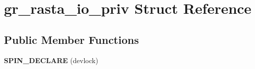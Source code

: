 \hypertarget{structgr__rasta__io__priv}{}\section{gr\+\_\+rasta\+\_\+io\+\_\+priv Struct Reference}
\label{structgr__rasta__io__priv}
\subsection*{Public Member Functions}
\begin{DoxyCompactItemize}
\item 
\mbox{\label{structgr__rasta__io__priv_a439dda12d825ab0593647ca3c8b536e3}} 
{\bfseries S\+P\+I\+N\+\_\+\+D\+E\+C\+L\+A\+RE} (devlock)
\end{DoxyCompactItemize}
